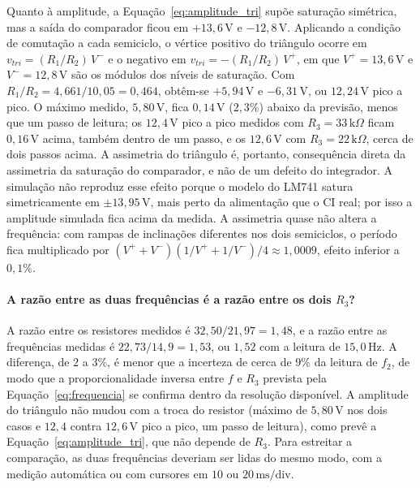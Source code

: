 \documentclass[11pt,a4paper]{article}
\begin{document}
Quanto à amplitude, a Equação~\ref{eq:amplitude_tri} supõe saturação simétrica, mas a saída do comparador ficou em $+13{,}6\,\text{V}$ e $-12{,}8\,\text{V}$. Aplicando a condição de comutação a cada semiciclo, o vértice positivo do triângulo ocorre em $v_{tri} = (R_1/R_2)\,V^{-}$ e o negativo em $v_{tri} = -(R_1/R_2)\,V^{+}$, em que $V^{+} = 13{,}6\,\text{V}$ e $V^{-} = 12{,}8\,\text{V}$ são os módulos dos níveis de saturação. Com $R_1/R_2 = 4{,}661/10{,}05 = 0{,}464$, obtêm-se $+5{,}94\,\text{V}$ e $-6{,}31\,\text{V}$, ou $12{,}24\,\text{V}$ pico a pico. O máximo medido, $5{,}80\,\text{V}$, fica $0{,}14\,\text{V}$ ($2{,}3\%$) abaixo da previsão, menos que um passo de leitura; os $12{,}4\,\text{V}$ pico a pico medidos com $R_3 = 33\,\text{k}\Omega$ ficam $0{,}16\,\text{V}$ acima, também dentro de um passo, e os $12{,}6\,\text{V}$ com $R_3 = 22\,\text{k}\Omega$, cerca de dois passos acima. A assimetria do triângulo é, portanto, consequência direta da assimetria da saturação do comparador, e não de um defeito do integrador. A simulação não reproduz esse efeito porque o modelo do LM741 satura simetricamente em $\pm13{,}95\,\text{V}$, mais perto da alimentação que o CI real; por isso a amplitude simulada fica acima da medida. A assimetria quase não altera a frequência: com rampas de inclinações diferentes nos dois semiciclos, o período fica multiplicado por $(V^{+}+V^{-})(1/V^{+}+1/V^{-})/4 \approx 1{,}0009$, efeito inferior a $0{,}1\%$.

\paragraph{A razão entre as duas frequências é a razão entre os dois $R_3$?}

A razão entre os resistores medidos é $32{,}50/21{,}97 = 1{,}48$, e a razão entre as frequências medidas é $22{,}73/14{,}9 = 1{,}53$, ou $1{,}52$ com a leitura de $15{,}0\,\text{Hz}$. A diferença, de $2$ a $3\%$, é menor que a incerteza de cerca de $9\%$ da leitura de $f_2$, de modo que a proporcionalidade inversa entre $f$ e $R_3$ prevista pela Equação~\ref{eq:frequencia} se confirma dentro da resolução disponível. A amplitude do triângulo não mudou com a troca do resistor (máximo de $5{,}80\,\text{V}$ nos dois casos e $12{,}4$ contra $12{,}6\,\text{V}$ pico a pico, um passo de leitura), como prevê a Equação~\ref{eq:amplitude_tri}, que não depende de $R_3$. Para estreitar a comparação, as duas frequências deveriam ser lidas do mesmo modo, com a medição automática ou com cursores em $10$ ou $20\,\text{ms/div}$.
\end{document}

